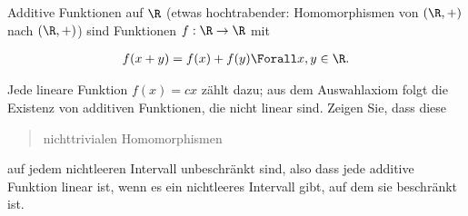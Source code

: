 
\begin{exercise}

Additive Funktionen auf $\R$ (etwas hochtrabender: Homomorphismen von $(\R, +)$ nach $(\R, +)$) sind Funktionen $f: \R \to \R$ mit

\begin{align*}
    f(x + y) = f(x) + f(y)
    \Forall x, y \in \R.
\end{align*}

Jede lineare Funktion $f(x) = c x$ zählt dazu;
aus dem Auswahlaxiom folgt die Existenz von additiven Funktionen, die nicht linear sind.
Zeigen Sie, dass diese \blockquote{nichttrivialen Homomorphismen} auf jedem nichtleeren Intervall unbeschränkt sind, also dass jede additive Funktion linear ist, wenn es ein nichtleeres Intervall gibt, auf dem sie beschränkt ist.

\end{exercise}


